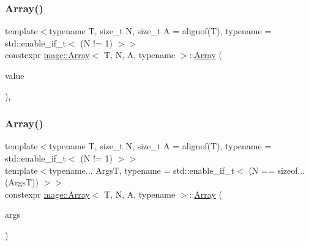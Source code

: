 \mbox{\label{structmage_1_1_array_a1f206f942c1318eb7f57c7e0666bc923}} 
\subsubsection{\texorpdfstring{Array()}{Array()}\hspace{0.1cm}{\footnotesize\ttfamily [2/10]}}
{\footnotesize\ttfamily template$<$typename T, size\+\_\+t N, size\+\_\+t A = alignof(\+T), typename  = std\+::enable\+\_\+if\+\_\+t$<$ (\+N != 1) $>$$>$ \\
constexpr \mbox{\hyperlink{structmage_1_1_array}{mage\+::\+Array}}$<$ T, N, A, typename $>$\+::\mbox{\hyperlink{structmage_1_1_array}{Array}} (\begin{DoxyParamCaption}\item[{const T \&}]{value }\end{DoxyParamCaption})\hspace{0.3cm}{\ttfamily [explicit]}, {\ttfamily [noexcept]}}

\mbox{\label{structmage_1_1_array_ab6dbce28b41b7ef1e9c0195f24f378a6}} 
\subsubsection{\texorpdfstring{Array()}{Array()}\hspace{0.1cm}{\footnotesize\ttfamily [3/10]}}
{\footnotesize\ttfamily template$<$typename T, size\+\_\+t N, size\+\_\+t A = alignof(\+T), typename  = std\+::enable\+\_\+if\+\_\+t$<$ (\+N != 1) $>$$>$ \\
template$<$typename... ArgsT, typename  = std\+::enable\+\_\+if\+\_\+t$<$ (\+N == sizeof...(\+Args\+T)) $>$$>$ \\
constexpr \mbox{\hyperlink{structmage_1_1_array}{mage\+::\+Array}}$<$ T, N, A, typename $>$\+::\mbox{\hyperlink{structmage_1_1_array}{Array}} (\begin{DoxyParamCaption}\item[{ArgsT \&\&...}]{args }\end{DoxyParamCaption})\hspace{0.3cm}{\ttfamily [noexcept]}}

\mbox{\label{structmage_1_1_array_a1e0a4b5cebb34709b32bc13e9ab917e1}} 
